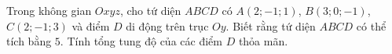 \begin{ex}
Trong không gian $Oxyz$, cho tứ diện $ABCD$ có $A(2;-1;1)$, $B(3;0;-1)$, $C(2;-1;3)$ và điểm $D$ di động trên trục $Oy$. Biết rằng tứ diện $ABCD$ có thể tích bằng $5$. Tính tổng tung độ của các điểm $D$ thỏa mãn.
\end{ex}
